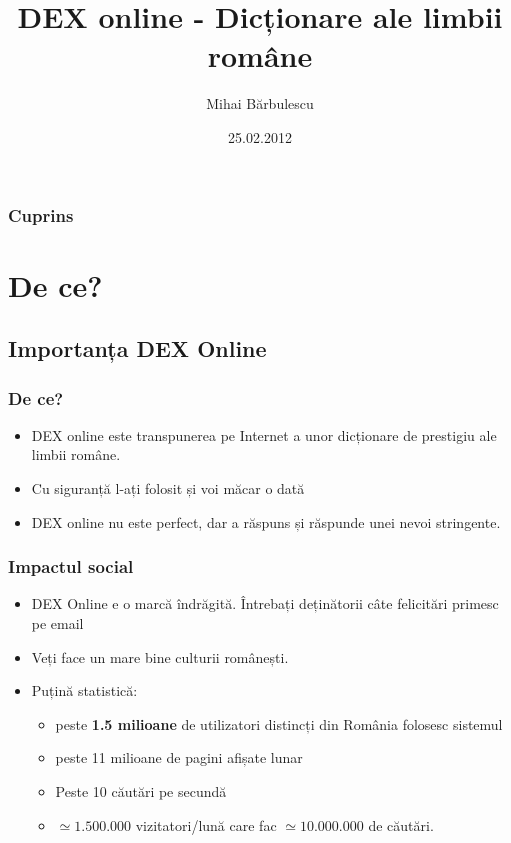 \documentclass[red]{beamer}
\begin{document}
\title{DEX online - Dicționare ale limbii române}  
\author{Mihai Bărbulescu}
\date{25.02.2012} 

\begin{frame}
\titlepage
\end{frame}

\begin{frame}
\frametitle{Cuprins}
\tableofcontents
\end{frame}


\section{De ce?} 
\subsection{Importanța DEX Online}
\begin{frame}
\frametitle{De ce?}
\begin{itemize}

  \item DEX online este transpunerea pe Internet a unor dicționare de prestigiu ale limbii române.
  \vspace{0.4cm}
  \item Cu siguranță l-ați folosit și voi măcar o dată 
  \vspace{0.4cm}
  \item DEX online nu este perfect, dar a răspuns și răspunde unei nevoi stringente.
 
\end{itemize}
\end{frame}

\begin{frame}
\frametitle{Impactul social}
\begin{itemize}
 \item DEX Online e o marcă îndrăgită. Întrebați deținătorii câte felicitări primesc pe email  
 \item Veți face un mare bine culturii românești.  \pause
  \item Puțină statistică: 
	\begin{itemize}
	 \item peste {\bf 1.5 milioane} de utilizatori distincți din România folosesc sistemul
	  \item peste 11 milioane de pagini afișate lunar 
	\item Peste 10 căutări pe secundă 
	  \item $\simeq 1.500.000$ vizitatori/lună care fac $\simeq 10.000.000$ de căutări.
	\end{itemize}
\end{itemize}
\end{frame}
\end{document}
